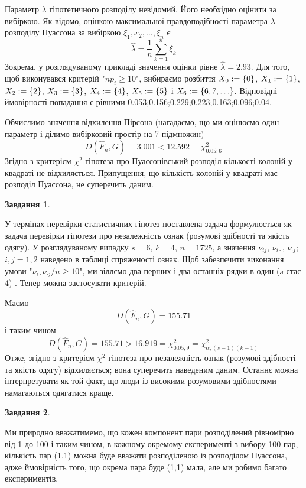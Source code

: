 \documentclass[12pt]{article} %
\newtheorem{prob}{Завдання}
\begin{document}
	Параметр $\lambda$ гіпотетичного розподілу невідомий. Його необхідно оцінити за вибіркою. Як відомо, оцінкою максимальної правдоподібності
	параметра $\lambda$ розподілу Пуассона за вибіркою $\xi_1,x_2,\hdots,\xi_n$ є
	\[\hat{\lambda}=\frac{1}{n}\sum_{k=1}^n\xi_k\]
	Зокрема, у розглядуваному прикладі значення оцінки рівне $\hat{\lambda}=2.93$. Для того, щоб виконувався критерій "$np_i\geq10$",
	вибираємо розбиття $X_0:=\left\{0\right\}$, $X_1:=\left\{1\right\}$, $X_2:=\left\{2\right\}$,
	$X_3:=\left\{3\right\}$, $X_4:=\left\{4\right\}$, $X_5:=\left\{5\right\}$ і $X_6:=\left\{6,7,\hdots\right\}$.
	Відповідні ймовірності попадання є рівними 0.053;0.156;0.229;0.223;0.163;0.096;0.04.

	Обчислимо значення відхилення Пірсона (нагадаємо, що ми оцінюємо один параметр і ділимо вибірковий простір на 7 підмножин)
	\[D(\hat{F}_n,G)=3.001<12.592=\chi^2_{0.05;6}\]
	Згідно з критерієм $\chi^2$ гіпотеза про Пуассонівський розподіл кількості колоній у квадраті не відхиляється. Припущення,
	що кількість колоній у квадраті має розподіл Пуассона, не суперечить даним.
\begin{prob}\end{prob}%
	У термінах перевірки статистичних гіпотез поставлена задача формулюється як задача перевірки гіпотези про незалежність ознак
	(розумові здібності та якість одягу). У розглядуваному випадку $s=6$, $k=4$, $n=1725$, а значення $\nu_{ij}$, $\nu_{i\cdot}$,
	$\nu_{\cdot j}$; $i,j=1,2$ наведено в таблиці спряженості ознак. Щоб забезпечити виконання умови
	"${\nu_{i\cdot}\nu_{\cdot j}/n\geq10}$", ми зіллємо два перших і два останніх рядки в один ($s$ стає 4)
	. Тепер можна застосувати критерій.
	
	Маємо
	\[D(\hat{F}_n,G)=155.71\]
	і таким чином
	\[D(\hat{F}_n,G)=155.71>16.919=\chi^2_{0.05;9}=\chi^2_{\alpha;(s-1)(k-1)}\]
	Отже, згідно з критерієм $\chi^2$ гіпотеза про незалежність ознак (розумові здібності та якість одягу) відхиляється; вона
	суперечить наведеним даним. Останнє можна інтерпретувати як той факт, що люди із високими розумовими здібностями намагаються
	одягатися краще.
\begin{prob}\end{prob}
	Ми природно вважатимемо, що кожен компонент пари розподілений рівномірно від 1 до 100 і таким чином, в кожному окремому
	експерименті з вибору 100 пар, кількість пар (1,1) можна буде вважати розподіленою із розподілом Пуассона, адже ймовірність
	того, що окрема пара буде (1,1) мала, але ми робимо багато експериментів.
\end{document}

